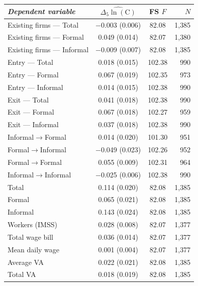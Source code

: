 \begin{threeparttable}
    \begin{tabular}{lccr}
        \toprule
        \textit{Dependent variable} & $\widehat{\Delta_5\ln(\text{C})}$ & FS $F$ & $N$ \\
        \midrule
        Existing firms --- Total    & $-$0.003 (0.006) & 82.08 & 1{,}385 \\
        Existing firms --- Formal   & 0.049\sym{***} (0.014) & 82.07 & 1{,}380 \\
        Existing firms --- Informal & $-$0.009 (0.007) & 82.08 & 1{,}385 \\
        Entry --- Total             & 0.018 (0.015) & 102.38 & 990 \\
        Entry --- Formal            & 0.067\sym{***} (0.019) & 102.35 & 973 \\
        Entry --- Informal          & 0.014 (0.015) & 102.38 & 990 \\
        Exit --- Total              & 0.041\sym{**} (0.018) & 102.38 & 990 \\
        Exit --- Formal             & 0.067\sym{***} (0.018) & 102.27 & 959 \\
        Exit --- Informal           & 0.037\sym{**} (0.018) & 102.38 & 990 \\
        \midrule
        Informal$\to$Formal   & 0.014 (0.020) & 101.30 & 951 \\
        Formal$\to$Informal   & $-$0.049\sym{**} (0.023) & 102.26 & 952 \\
        Formal$\to$Formal     & 0.055\sym{***} (0.009) & 102.31 & 964 \\
        Informal$\to$Informal & $-$0.025\sym{***} (0.006) & 102.38 & 990 \\
        \midrule
        Total    & 0.114\sym{***} (0.020) & 82.08 & 1{,}385 \\
        Formal   & 0.065\sym{***} (0.021) & 82.08 & 1{,}385 \\
        Informal & 0.143\sym{***} (0.024) & 82.08 & 1{,}385 \\
        \midrule
        Workers (IMSS)  & 0.028\sym{***} (0.008) & 82.07 & 1{,}377 \\
        Total wage bill & 0.036\sym{***} (0.014) & 82.07 & 1{,}377 \\
        Mean daily wage & 0.001 (0.004) & 82.07 & 1{,}377 \\
        Average VA      & 0.022 (0.021) & 82.08 & 1{,}385 \\
        Total VA        & 0.018 (0.019) & 82.08 & 1{,}385 \\

\end{tabular}
\end{threeparttable}

